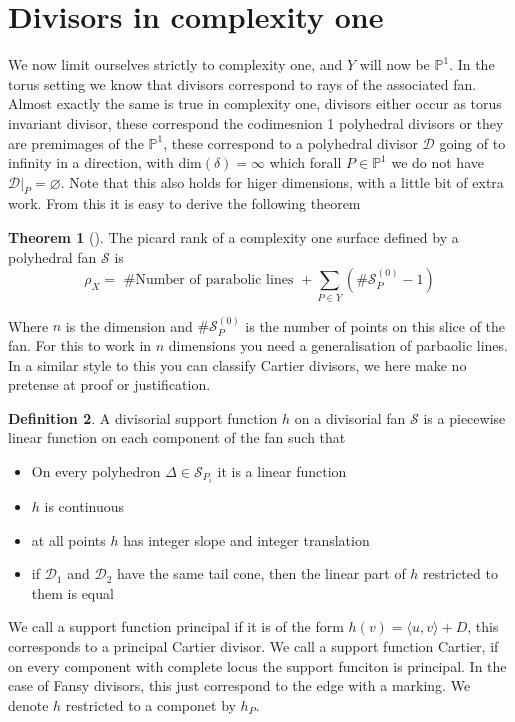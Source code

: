 \documentclass[11pt]{report}
\theoremstyle{definition}
\newtheorem{thm}{Theorem}[section]
\theoremstyle{definition}
\theoremstyle{definition}
\theoremstyle{definition}
\newtheorem{dfn}[thm]{Definition}
\theoremstyle{definition}
\theoremstyle{definition}
\theoremstyle{definition}
\begin{document}
\section{Divisors in complexity one}

We now limit ourselves strictly to complexity one, and $Y$ will now be $\mathbb{P}^1$. In the torus setting we know that divisors correspond to rays of the associated fan. Almost exactly the same is true in complexity one, divisors either occur as torus invariant divisor, these correspond the codimesnion 1 polyhedral divisors or they are premimages of the $\mathbb{P}^1$, these correspond to a polyhedral divisor $\mathcal{D}$  going of to infinity in a direction, with dim$(\delta) = \infty$ which forall $P \in \mathbb{P}^1$ we do not have $\mathcal{D}  |_P = \varnothing$. Note that this also holds for higer dimensions, with a little bit of extra work. From this it is easy to derive the following theorem
\\
\begin{thm}[\cite{PS}]
The picard rank of a complexity one surface defined by a polyhedral fan $\mathcal{S}$ is 
\[
\rho_X =  \text{ \# Number of parabolic lines } + \sum_{P \in Y} (\# \mathcal{S}_P^{(0)} - 1) 
\]
\end{thm}
Where $n$ is the dimension and $\# \mathcal{S}_P^{(0)}$ is the number of points on this slice of the fan.
For this to work in $n$ dimensions you need a generalisation of parbaolic lines. In a similar style to this you can classify Cartier divisors, we here make no pretense at proof or justification. 
\begin{dfn}
A divisorial support function $h$ on a divisorial fan $\mathcal{S}$ is a piecewise linear function on each component of the fan such that

\begin{itemize}
\item On every polyhedron $\Delta \in \mathcal{S}_{P_i}$ it is a linear function
\item $h$ is continuous
\item at all points $h$ has integer slope and integer translation
\item if $\mathcal{D}_1$ and $\mathcal{D}_2$ have the same tail cone, then the linear part of $h$ restricted to them is equal
\end{itemize}
\end{dfn}
We call a support function principal if it is of the form $h(v) = \langle u, v \rangle + D$, this corresponds to a principal Cartier divisor. We call a support function Cartier, if on every component with complete locus the support funciton is principal. In the case of Fansy divisors, this just correspond to the edge with a marking. We denote $h$ restricted to a componet by $h_P$. 
\end{document}
